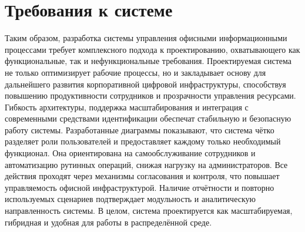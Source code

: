 \section{Требования к системе}









Таким образом, разработка системы управления офисными информационными процессами требует комплексного подхода к проектированию, охватывающего как функциональные, так и нефункциональные требования. Проектируемая система не только оптимизирует рабочие процессы, но и закладывает основу для дальнейшего развития корпоративной цифровой инфраструктуры, способствуя повышению продуктивности сотрудников и прозрачности управления ресурсами. Гибкость архитектуры, поддержка масштабирования и интеграция с современными средствами идентификации обеспечат стабильную и безопасную работу системы. Разработанные диаграммы показывают, что система чётко разделяет роли пользователей и предоставляет каждому только необходимый функционал. Она ориентирована на самообслуживание сотрудников и автоматизацию рутинных операций, снижая нагрузку на администраторов. Все действия проходят через механизмы согласования и контроля, что повышает управляемость офисной инфраструктурой. Наличие отчётности и повторно используемых сценариев подтверждает модульность и аналитическую направленность системы. В целом, система проектируется как масштабируемая, гибридная и удобная для работы в распределённой среде.
